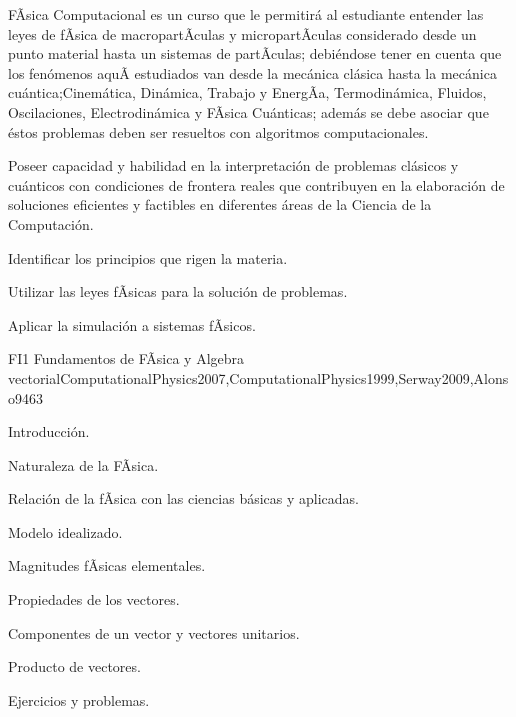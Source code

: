 \begin{syllabus}


\begin{justification}
FÃ­sica Computacional es un curso que le permitirá al estudiante entender
las leyes de fÃ­sica de macropartÃ­culas y micropartÃ­culas considerado desde un
punto material hasta un sistemas de partÃ­culas; debiéndose tener en cuenta que los
fenómenos aquÃ­ estudiados van desde la mecánica clásica hasta la mecánica cuántica;Cinemática, Dinámica, Trabajo y EnergÃ­a, Termodinámica, Fluidos, Oscilaciones, Electrodinámica y FÃ­sica Cuánticas; 
además se debe asociar que éstos problemas deben ser resueltos con algoritmos computacionales.

Poseer capacidad y habilidad en la interpretación de problemas clásicos y cuánticos 
con condiciones de frontera reales que contribuyen en la elaboración de soluciones eficientes
y factibles en diferentes áreas de la Ciencia de la Computación.
\end{justification}

\begin{goals}
\item Identificar los principios que rigen la materia.
\item Utilizar las leyes fÃ­sicas para la solución de problemas.
\item Aplicar la simulación a sistemas fÃ­sicos.
\end{goals}

\begin{outcomes}
\end{outcomes}

\begin{unit}{FI1 Fundamentos de FÃ­sica y Algebra vectorial}{ComputationalPhysics2007,ComputationalPhysics1999,Serway2009,Alonso94}{6}{3}
\begin{topics}
      \item Introducción.
      \item Naturaleza de la FÃ­sica.
      \item Relación de la fÃ­sica con las ciencias básicas y aplicadas.
      \item Modelo idealizado.
      \item Magnitudes fÃ­sicas  elementales.
      \item Propiedades de los vectores.
      \item Componentes de un vector y vectores unitarios.
      \item Producto de vectores.
      \item Ejercicios y problemas.
   \end{topics}


\end{unit}
\end{syllabus}
